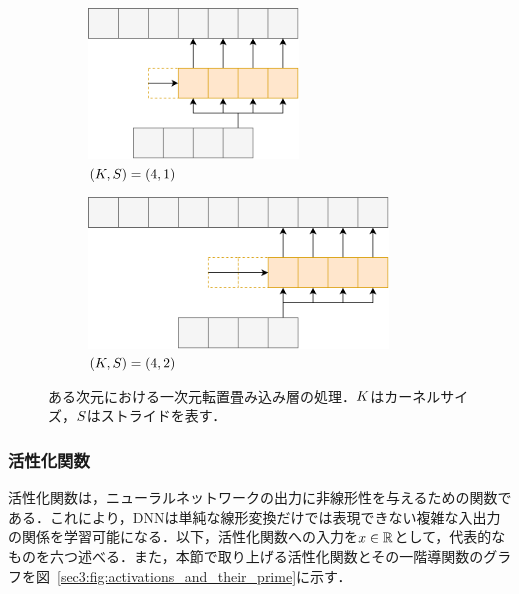 \documentclass[12pt]{jarticle}
\numberwithin{equation}{section}    %
\numberwithin{figure}{section}      %
\numberwithin{table}{section}      %
\begin{document}
\begin{figure}[tb]
    \centering
    \begin{subfigure}[b]{0.48\textwidth}
        \centering
        \includegraphics[height=4cm]{./figure/sec3/tconv1.drawio.png}
        \caption{$(K, S) = (4, 1)$}
        \label{sec3:fig:tconv1}
    \end{subfigure}
    \begin{subfigure}[b]{0.48\textwidth}
        \centering
        \includegraphics[height=4cm]{./figure/sec3/tconv2.drawio.png}
        \caption{$(K, S) = (4, 2)$}
        \label{sec3:fig:tconv2}
    \end{subfigure}
    \caption{ある次元における一次元転置畳み込み層の処理．$K$はカーネルサイズ，$S$はストライドを表す．}
    \label{sec3:fig:tconv_variations}
\end{figure}

\subsubsection{活性化関数}
活性化関数は，ニューラルネットワークの出力に非線形性を与えるための関数である．これにより，DNNは単純な線形変換だけでは表現できない複雑な入出力の関係を学習可能になる．以下，活性化関数への入力を$x \in \mathbb{R}$として，代表的なものを六つ述べる．また，本節で取り上げる活性化関数とその一階導関数のグラフを図~\ref{sec3:fig:activations_and_their_prime}に示す．
\end{document}
